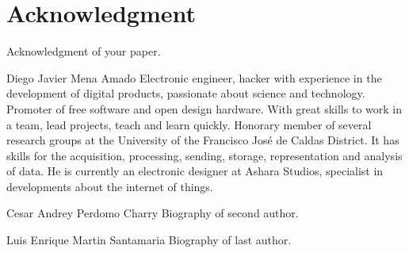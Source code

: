 \documentclass[letterpaper,12pt,twoside]{articleingud}
\begin{document}
\section*{Acknowledgment}%
Acknowledgment of your paper.
\begin{biography}%
{Diego Javier Mena Amado}%
Electronic engineer, hacker with experience in the development of digital products, passionate about science and technology. Promoter of free software and open design hardware. With great skills to work in a team, lead projects, teach and learn quickly. Honorary member of several research groups at the University of the Francisco José de Caldas District. It has skills for the acquisition, processing, sending, storage, representation and analysis of data. He is currently an electronic designer at Ashara Studios, specialist in developments about the internet of things.
\end{biography}
\begin{biography}%
{Cesar Andrey Perdomo Charry}%
Biography of second author.
\end{biography}
\begin{biography}%
{Luis Enrique Martin Santamaria}%
Biography of last author.
\end{biography}
\end{document}
